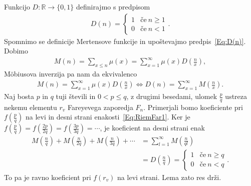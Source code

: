 \documentclass[mat1]{fmfdelo}
\begin{document}
\begin{dokaz}
Funkcijo $D: \mathbb{R} \to \{0,1\}$ definirajmo s predpisom
\begin{align}
\label{Eq:D(n)}
D(n) = \left\{
\begin{array}{rl}
	1 & \textrm{če}\ n \geq 1 \\
	0 & \textrm{če}\ n < 1
\end{array}.
\right.
\end{align}
Spomnimo se definicije Mertensove funkcije in upoštevajmo predpis~\eqref{Eq:D(n)}. Dobimo
\begin{align*}
M(n) = \sum_{x \leq n} \mu(x) = \sum_{x=1}^{\infty} \mu(x) D \left( \frac{n}{x} \right),
\end{align*}
M\"obiusova inverzija pa nam da ekvivalenco
\begin{align*}
M(n) = \sum_{x=1}^{\infty} \mu(x) D \left( \frac{n}{x} \right) \Longleftrightarrow
D(n) = \sum_{x=1}^{\infty} M \left( \frac{n}{x} \right).
\end{align*}
Naj bosta $p$ in $q$ tuji števili in $0 < p \leq q$, z drugimi besedami, ulomek $\frac{p}{q}$ ustreza nekemu elementu $r_{v}$ Fareyevega zaporedja $F_{n}$.
Primerjali bomo koeficiente pri $f(\frac{p}{q})$ na levi in desni strani enakosti~\eqref{Eq:RiemFar1}.
Ker je $ f(\frac{p}{q}) = f(\frac{2p}{2q}) = f(\frac{3p}{3q}) = \cdots $, je koeficient na desni strani enak 
%
\begin{align*}
M \left(\frac{n}{q} \right) + M \left(\frac{n}{2q} \right) + M \left(\frac{n}{3q} \right) + \cdots &= \sum_{l=1}^{\infty} M \left(\frac{n}{ql} \right) \\
&= D \left(\frac{n}{q} \right) = \left\{
\begin{array}{rl}
	1 & \textrm{če}\ n \geq q \\
	0 & \textrm{če}\ n < q
\end{array}.
\right.
\end{align*}
%
To pa je ravno koeficient pri $f(r_{v})$ na levi strani. Lema zato res drži.
%
\end{dokaz}

\end{document}
